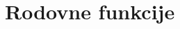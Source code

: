 \documentclass[a4paper,12pt]{article}
\theoremstyle{definition}
\theoremstyle{remark}
\newtheorem*{ex}{Primer}
\begin{document}
%

\section{Rodovne funkcije}
\end{document}
